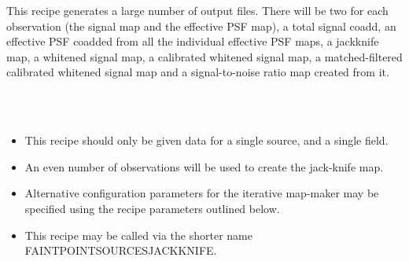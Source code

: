 \documentclass[twoside,11pt]{article}
\renewcommand{\_}{\texttt{\symbol{95}}}
\newcommand{\sstnotes}[1]{\item[Notes:] \mbox{} \\[1.3ex] #1}
\newcommand{\sstitemlist}[1]{
  \mbox{} \\
  \vspace{-3.5ex}
  \begin{itemize}
     #1
  \end{itemize}
}
\newcommand{\sstitem}{\item}
\newcommand{\sstnotes}[1]{\item[Notes:] #1 }
\newcommand{\sstitemlist}[1]{
      \begin{itemize}
         #1
      \end{itemize}
      \\
   }
\newcommand{\sstitem}{\item}
\begin{document}
{{      This recipe generates a large number of output files. There will
      be two for each observation (the signal map and the effective PSF
      map), a total signal coadd, an effective PSF coadded from all the
      individual effective PSF maps, a jackknife map, a whitened signal
      map, a calibrated whitened signal map, a matched-filtered
      calibrated whitened signal map and a signal-to-noise ratio map
      created from it.
   }
   \sstnotes{
      \sstitemlist{

         \sstitem
         This recipe should only be given data for a single source, and
         a single field.

         \sstitem
         An even number of observations will be used to create the
         jack-knife map.

         \sstitem
         Alternative configuration parameters for the iterative
         map-maker may be specified using the recipe parameters outlined
         below.

         \sstitem
         This recipe may be called via the shorter name
         FAINT\_POINT\_SOURCES\_JACKKNIFE.

}}}
\end{document}
